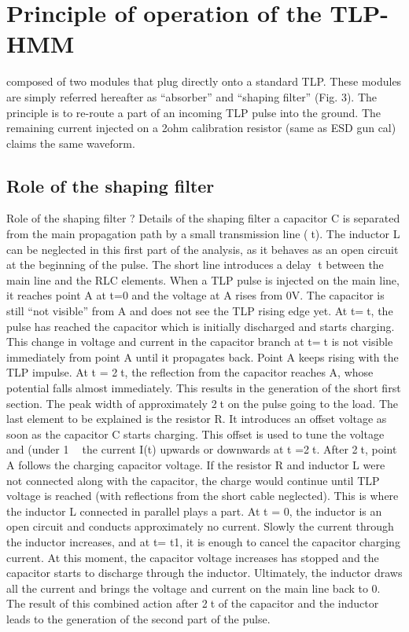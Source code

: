 \section{Principle of operation of the TLP-HMM}

composed of two modules that plug directly onto a standard TLP.
These modules are simply referred hereafter as “absorber” and “shaping filter” (Fig. 3).
The principle is to re-route a part of an incoming TLP pulse into the ground.
The remaining current injected on a 2ohm calibration resistor (same as ESD gun cal) claims the same waveform.


\subsection{Role of the shaping filter}

Role of the shaping filter ?
Details of the shaping filter
a capacitor C is separated from the main propagation path by a small transmission line (t).
The inductor L can be neglected in this first part of the analysis, as it behaves as an open circuit at the beginning of the pulse.
The short line introduces a delay t between the main line and the RLC elements.
When a TLP pulse is injected on the main line, it reaches point A at t=0 and the voltage at A rises from 0V.
The capacitor is still “not visible” from A and does not see the TLP rising edge yet.
At t=t, the pulse has reached the capacitor which is initially discharged and starts charging.
This change in voltage and current in the capacitor branch at t=t is not visible immediately from point A until it propagates back.
Point A keeps rising with the TLP impulse.
At t = 2t, the reflection from the capacitor reaches A, whose potential falls almost immediately.
This results in the generation of the short first section.
The peak width of approximately 2t on the pulse going to the load.
The last element to be explained is the resistor R.
It introduces an offset voltage as soon as the capacitor C starts charging.
This offset is used to tune the voltage and (under 1  the current I(t) upwards or downwards at t =2t.
After 2t, point A follows the charging capacitor voltage.
If the resistor R and inductor L were not connected along with the capacitor, the charge would continue until TLP voltage is reached (with reflections from the short cable neglected).
This is where the inductor L connected in parallel plays a part.
At t = 0, the inductor is an open circuit and conducts approximately no current.
Slowly the current through the inductor increases, and at t= t1, it is enough to cancel the capacitor charging current.
At this moment, the capacitor voltage increases has stopped and the capacitor starts to discharge through the inductor.
Ultimately, the inductor draws all the current and brings the voltage and current on the main line back to 0.
The result of this combined action after 2t of the capacitor and the inductor leads to the generation of the second part of the pulse.

